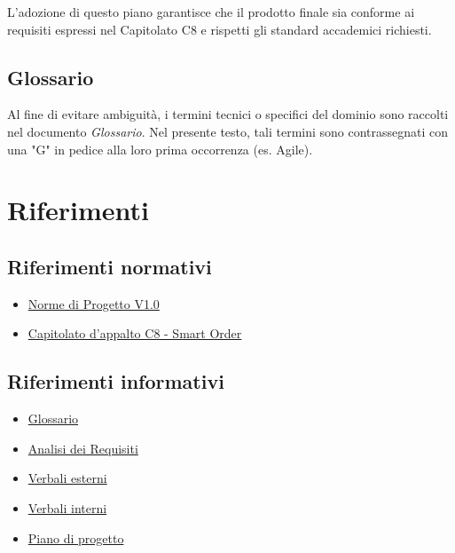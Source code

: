 \documentclass[a4paper,11pt,oneside]{scrartcl}
\begin{document}
L'adozione di questo piano garantisce che il prodotto finale sia conforme ai requisiti espressi nel Capitolato C8 e rispetti gli standard accademici richiesti.

\subsection{Glossario}
Al fine di evitare ambiguità, i termini tecnici o specifici del dominio sono raccolti nel documento \textit{Glossario}.
Nel presente testo, tali termini sono contrassegnati con una "G" in pedice alla loro prima occorrenza (es. Agile{\scriptsize{}}).

\section{Riferimenti}

\subsection{Riferimenti normativi}
\begin{itemize}
    \item \href{https://github.com/swenightpro/Documentazione/blob/main/docs/Candidatura/Documentazione%20Interna}{Norme di Progetto V1.0}
    \item \href{https://www.math.unipd.it/~tullio/IS-1/2025/Progetto/C8.pdf}{Capitolato d’appalto C8 - Smart Order}
\end{itemize}

\subsection{Riferimenti informativi}
\begin{itemize}
    \item \href{https://github.com/swenightpro/Documentazione/blob/main/docs/RTB/Documentazione%20Esterna}{Glossario}
    \item \href{https://github.com/swenightpro/Documentazione/tree/main/docs/RTB/Documentazione%20Esterna}{Analisi dei Requisiti}
    \item \href{https://github.com/swenightpro/Documentazione/tree/main/docs/RTB/Documentazione%20Esterna/Verbali%20Esterni}{Verbali esterni}
    \item \href{https://github.com/swenightpro/Documentazione/tree/main/docs/RTB/Documentazione%20Interna/Verbali%20Interni}{Verbali interni}
    \item \href{https://github.com/swenightpro/Documentazione/tree/main/docs/RTB/Documentazione%20Esterna}{Piano di progetto}
\end{itemize}
\end{document}
